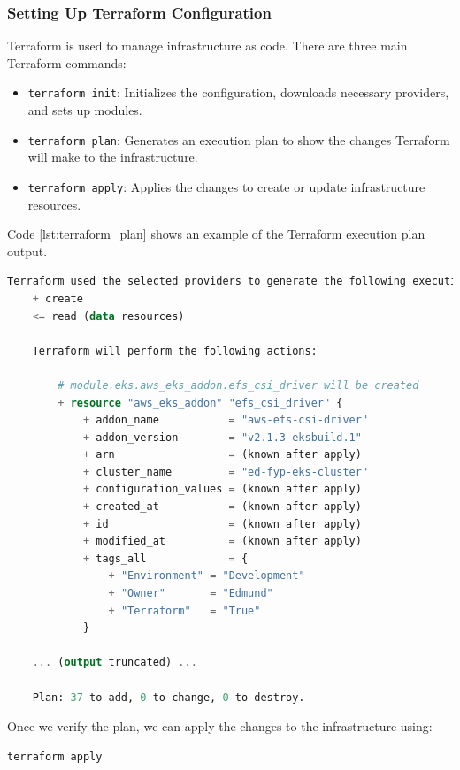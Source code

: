 \subsubsection{Setting Up Terraform Configuration}
Terraform is used to manage infrastructure as code. There are three main Terraform commands:
\begin{itemize}
    \item \texttt{terraform init}: Initializes the configuration, downloads necessary providers, and sets up modules.
    \item \texttt{terraform plan}: Generates an execution plan to show the changes Terraform will make to the infrastructure.
    \item \texttt{terraform apply}: Applies the changes to create or update infrastructure resources.
\end{itemize}

Code \ref{lst:terraform_plan} shows an example of the Terraform execution plan output.

\begin{lstlisting}[language=Terraform, caption={Terraform Plan Output}, label={lst:terraform_plan}]
Terraform used the selected providers to generate the following execution plan. Resource actions are indicated with the following symbols:
    + create
    <= read (data resources)
  
    Terraform will perform the following actions:
    
        # module.eks.aws_eks_addon.efs_csi_driver will be created
        + resource "aws_eks_addon" "efs_csi_driver" {
            + addon_name           = "aws-efs-csi-driver"
            + addon_version        = "v2.1.3-eksbuild.1"
            + arn                  = (known after apply)
            + cluster_name         = "ed-fyp-eks-cluster"
            + configuration_values = (known after apply)
            + created_at           = (known after apply)
            + id                   = (known after apply)
            + modified_at          = (known after apply)
            + tags_all             = {
                + "Environment" = "Development"
                + "Owner"       = "Edmund"
                + "Terraform"   = "True"
            }
        
    ... (output truncated) ...

    Plan: 37 to add, 0 to change, 0 to destroy.

\end{lstlisting}

Once we verify the plan, we can apply the changes to the infrastructure using: 
\begin{verbatim}
terraform apply
\end{verbatim}

